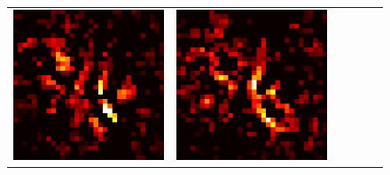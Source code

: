 \documentclass[preprint,12pt]{elsarticle}
\begin{document}
\begin{figure}[p]
\begin{tabular}{cccccc}
  \includegraphics[scale=\scale]{../visualizations/examples/cifar10/cnn/active_saliency_map/6.png} & 
  \includegraphics[scale=\scale]{../visualizations/examples/cifar10/cnn/inactive_saliency_map/6.png} \\
  

\end{tabular}
\end{figure}
\end{document}
